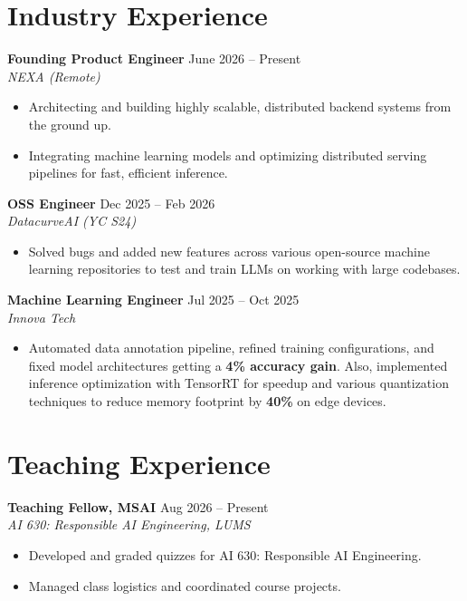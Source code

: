 \documentclass[11pt]{article}
\begin{document}
\section{Industry Experience}
\textbf{Founding Product Engineer} \hfill June 2026 -- Present\\
\textit{NEXA (Remote)}
\begin{itemize}
    \item Architecting and building highly scalable, distributed backend systems from the ground up.
    \item Integrating machine learning models and optimizing distributed serving pipelines for fast, efficient inference.
\end{itemize}

\textbf{OSS Engineer} \hfill Dec 2025 -- Feb 2026\\
\textit{DatacurveAI (YC S24)}
\begin{itemize}
    \item Solved bugs and added new features across various open-source machine learning repositories to test and train LLMs on working with large codebases.
\end{itemize}

\textbf{Machine Learning Engineer} \hfill Jul 2025 -- Oct 2025\\
\textit{Innova Tech}
\begin{itemize}
  \item Automated data annotation pipeline, refined training configurations, and fixed model architectures getting a \textbf{4\% accuracy gain}. Also, implemented inference optimization with TensorRT for speedup and various quantization techniques to reduce memory footprint by \textbf{40\%} on edge devices.
\end{itemize}

\section{Teaching Experience}
\textbf{Teaching Fellow, MSAI} \hfill Aug 2026 -- Present\\
\textit{AI 630: Responsible AI Engineering, LUMS}
\begin{itemize}
    \item Developed and graded quizzes for AI 630: Responsible AI Engineering.
    \item Managed class logistics and coordinated course projects.
\end{itemize}
\end{document}
